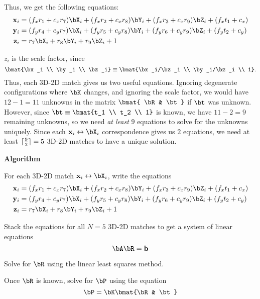 \begin{answer}
  Thus, we get the following equations:
  \begin{align*}
    \bx_i &= (f_x r_1 + c_x r_7)\bX_i + (f_x r_2 + c_x r_8)\bY_i + (f_x r_3 + c_x r_9) \bZ_i + (f_x t_1 + c_x) \\
    \by_i &= (f_y r_4 + c_y r_7)\bX_i + (f_y r_5 + c_y r_8)\bY_i + (f_y r_6 + c_y r_9) \bZ_i + (f_y t_2 + c_y) \\
    \bz_i &= r_7 \bX_i + r_8 \bY_i + r_9 \bZ_i + 1
  \end{align*}

  $z_i$ is the scale factor, since
  \[ \bmat{\bx_i \\ \by_i \\ \bz_i} \equiv \bmat{\bx_i/\bz_i \\ \by_i/\bz_i \\ 1}. \]
  Thus, each 3D-2D match gives us two useful equations.
  Ignoring degenerate configurations where $\bK$ changes,
  and ignoring the scale factor, we would have $12 - 1 = 11$ unknowns in the matrix
  $\bmat{ \bR & \bt }$ if $\bt$ was unknown.
  However, since $\bt \equiv \bmat{t_1 \\ t_2 \\ 1}$ is known,
  we have $11-2 = 9$ remaining unknowns,
  so we need \emph{at least} $9$ equations to solve for the unknowns uniquely.
  Since each $\bx_i \leftrightarrow \bX_i$ correspondence gives us $2$ equations,
  we need at least $\lceil{} \frac{9}{2} \rceil = 5$ 3D-2D matches to have a unique solution.

  \step
  \textbf{Algorithm}
  \begin{enumarabic}
    \item For each 3D-2D match $\bx_i \leftrightarrow \bX_i$, write the equations
    \begin{align*}
      \bx_i &= (f_x r_1 + c_x r_7)\bX_i + (f_x r_2 + c_x r_8)\bY_i + (f_x r_3 + c_x r_9) \bZ_i + (f_x t_1 + c_x) \\
      \by_i &= (f_y r_4 + c_y r_7)\bX_i + (f_y r_5 + c_y r_8)\bY_i + (f_y r_6 + c_y r_9) \bZ_i + (f_y t_2 + c_y) \\
      \bz_i &= r_7 \bX_i + r_8 \bY_i + r_9 \bZ_i + 1
    \end{align*}
    \item Stack the equations for all $N = 5$ 3D-2D matches to get a system of linear equations
      \[ \bA \bR = \bb \]
    \item Solve for $\bR$ using the linear least squares method.
    \item Once $\bR$ is known, solve for $\bP$ using the equation
      \[ \bP = \bK \bmat{\bR & \bt} \]
  \end{enumarabic}
\end{answer}
